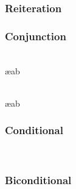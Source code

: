 \begin{multicols}{2}
\subsubsection*{Reiteration}

\begin{pf}
	 
\end{pf}


\subsubsection*{Conjunction}

\begin{pf}
	 

\\	 \ae{ab}

\\	 \ae{ab}
\end{pf}

\subsubsection*{Conditional}

\begin{pf}
	\open
		\ellipsesline
	\close

\\	
	 
\end{pf}

\subsubsection*{Biconditional}

\begin{pf}

\\
\end{pf}

%
%



\end{multicols}

